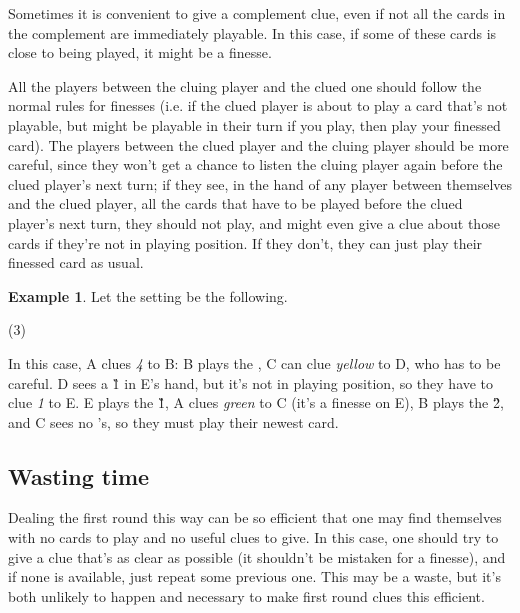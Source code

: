 \documentclass[a4paper]{article}
\theoremstyle{plain}
\theoremstyle{definition}
\newtheorem{example}[theorem]{Example}
\begin{document}
Sometimes it is convenient to give a complement clue, even if not all the cards in the complement are immediately playable. In this case, if some of these cards is close to being played, it might be a finesse.

All the players between the cluing player and the clued one should follow the normal rules for finesses (i.e. if the clued player is about to play a card that's not playable, but might be playable in their turn if you play, then play your finessed card). The players between the clued player and the cluing player should be more careful, since they won't get a chance to listen the cluing player again before the clued player's next turn; if they see, in the hand of any player between themselves and the clued player, all the cards that have to be played before the clued player's next turn, they should not play, and might even give a clue about those cards if they're not in playing position. If they don't, they can just play their finessed card as usual.

\begin{example}
	
	Let the setting be the following.
	
	\begin{tasks}(3)
		\task[+]      
		\task[A]    
		\task[B]    
		\task[C]    
		\task[D]    
		\task[E]    
	\end{tasks}
	
	In this case, A clues \textit{4} to B: B plays the , C can clue \textit{yellow} to D, who has to be careful. D sees a \G{1} in E's hand, but it's not in playing position, so they have to clue \textit{1} to E. E plays the \G{1}, A clues \textit{green} to C (it's a finesse on E), B plays the \G{2}, and C sees no 's, so they must play their newest card.
\end{example}

\subsection{Wasting time}

Dealing the first round this way can be so efficient that one may find themselves with no cards to play and no useful clues to give. In this case, one should try to give a clue that's as clear as possible (it shouldn't be mistaken for a finesse), and if none is available, just repeat some previous one. This may be a waste, but it's both unlikely to happen and necessary to make first round clues this efficient.
                                                           
\end{document}
